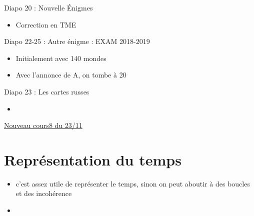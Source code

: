 \documentclass{article}
\theoremstyle{plain}%
\theoremstyle{definition}
\theoremstyle{remark}
\begin{document}
Diapo 20 : Nouvelle Énigmes
\begin{itemize}
    \item Correction en TME
\end{itemize}

Diapo 22-25 : Autre énigme : EXAM 2018-2019
\begin{itemize}
    \item Initialement avec 140 mondes 
    \item Avec l'annonce de A, on tombe à 20 
\end{itemize}

Diapo 23 : Les cartes russes 
\begin{itemize}
    \item 
\end{itemize}

\underline{Nouveau cours8 du 23/11} \\

\section{Représentation du temps }
\begin{itemize}
    \item c'est assez utile de représenter le temps, sinon on peut aboutir à des boucles et des incohérence 
    \item 
\end{itemize}
\end{document}
